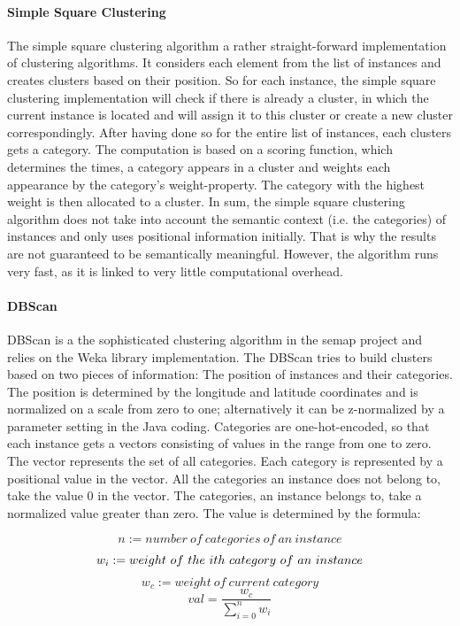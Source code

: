 \paragraph{Simple Square Clustering }
The simple square clustering algorithm a rather straight-forward implementation of clustering algorithms. It considers each element from the list of instances and creates clusters based on their position. So for each instance, the simple square clustering implementation will check if there is already a cluster, in which the current instance is located and will assign it to this cluster or create a new cluster correspondingly. After having done so for the entire list of instances, each clusters gets a category. The computation is based on a scoring function, which determines the times, a category appears in a cluster and weights each appearance by the category’s weight-property. The category with the highest weight is then allocated to a cluster. In sum, the simple square clustering algorithm does not take into account the semantic context (i.e. the categories) of instances and only uses positional information initially. That is why the results are not guaranteed to be semantically meaningful. However, the algorithm runs very fast, as it is linked to very little computational overhead.

\paragraph{DBScan}
DBScan is a the sophisticated clustering algorithm in the semap project and relies on the Weka library implementation. The DBScan tries to build clusters based on two pieces of information: The position of instances and their categories. The position is determined by the longitude and latitude coordinates and is normalized on a scale from zero to one; alternatively it can be z-normalized by a parameter setting in the Java coding. Categories are one-hot-encoded, so that each instance gets a vectors consisting of values in the range from one to zero. The vector represents the set of all categories. Each category is represented by a positional value in the vector. All the categories an instance does not belong to, take the value 0 in the vector. The categories, an instance belongs to, take a normalized value greater than zero. The value is determined by the formula: 

\[n := number~of~categories~of~an~instance \]
\[w_i := weight~of~the~i\-th~category~of~an~instance \]
\[w_c := weight~of~current~category \]
\[val = \frac{w_c}{\sum_{i=0}^{n}w_i} \]


